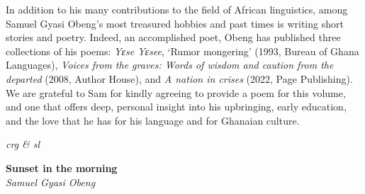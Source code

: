 \begin{refsection}

\noindent In addition to his many contributions to the field of African linguistics, among Samuel Gyasi Obeng's most treasured hobbies and past times is writing short stories and poetry. Indeed, an accomplished poet, Obeng has published three collections of his poems: \textit{Yɛse Yɛsee}, `Rumor mongering' (1993, Bureau of Ghana Languages), \textit{Voices from the graves: Words of wisdom and caution from the departed} (2008, Author House), and \textit{A nation in crises} (2022, Page Publishing). We are grateful to Sam for kindly agreeing to provide a poem for this volume, and one that offers deep, personal insight into his upbringing, early education, and the love that he has for his language and for Ghanaian culture.
\vspace{.2in}

\hfill \textit{crg \& sl}
\vspace{.2in}

\noindent \textbf{Sunset in the morning}\\
\noindent \textit{Samuel Gyasi Obeng}
\vspace{.2in}


\end{refsection}
